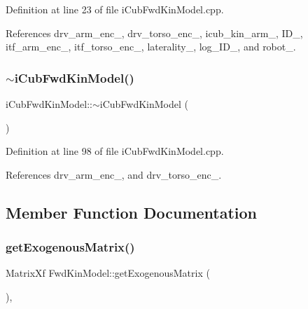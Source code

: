 Definition at line 23 of file i\+Cub\+Fwd\+Kin\+Model.\+cpp.



References drv\+\_\+arm\+\_\+enc\+\_\+, drv\+\_\+torso\+\_\+enc\+\_\+, icub\+\_\+kin\+\_\+arm\+\_\+, I\+D\+\_\+, itf\+\_\+arm\+\_\+enc\+\_\+, itf\+\_\+torso\+\_\+enc\+\_\+, laterality\+\_\+, log\+\_\+\+I\+D\+\_\+, and robot\+\_\+.

\mbox{\label{classiCubFwdKinModel_a60922638092ac5432739602e6541f9e4}} 
\subsubsection{\texorpdfstring{$\sim$i\+Cub\+Fwd\+Kin\+Model()}{~iCubFwdKinModel()}}
{\footnotesize\ttfamily i\+Cub\+Fwd\+Kin\+Model\+::$\sim$i\+Cub\+Fwd\+Kin\+Model (\begin{DoxyParamCaption}{ }\end{DoxyParamCaption})\hspace{0.3cm}{\ttfamily [noexcept]}}



Definition at line 98 of file i\+Cub\+Fwd\+Kin\+Model.\+cpp.



References drv\+\_\+arm\+\_\+enc\+\_\+, and drv\+\_\+torso\+\_\+enc\+\_\+.



\subsection{Member Function Documentation}
\mbox{\label{classFwdKinModel_ac8ed4e8a52f5ff33cc158c80c6cf083e}} 
\subsubsection{\texorpdfstring{get\+Exogenous\+Matrix()}{getExogenousMatrix()}}
{\footnotesize\ttfamily Matrix\+Xf Fwd\+Kin\+Model\+::get\+Exogenous\+Matrix (\begin{DoxyParamCaption}{ }\end{DoxyParamCaption})\hspace{0.3cm}{\ttfamily [override]}, {\ttfamily [inherited]}}



